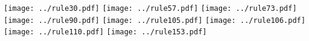 \documentclass{standalone}
\begin{document}
    \texttt{[image: ../rule30.pdf]}%
    \texttt{[image: ../rule57.pdf]}%
    \texttt{[image: ../rule73.pdf]}%
    \texttt{[image: ../rule90.pdf]}%
    \texttt{[image: ../rule105.pdf]}%
    \texttt{[image: ../rule106.pdf]}%
    \texttt{[image: ../rule110.pdf]}%
    \texttt{[image: ../rule153.pdf]}%
\end{document}
